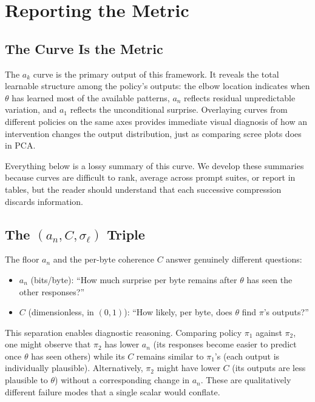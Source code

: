 \section{Reporting the Metric}

\subsection{The Curve Is the Metric}

The $a_k$ curve is the primary output of this framework.
It reveals the total learnable structure among the policy's outputs: the elbow location indicates when $\theta$ has learned most of the available patterns, $a_n$ reflects residual unpredictable variation, and $a_1$ reflects the unconditional surprise.
Overlaying curves from different policies on the same axes provides immediate visual diagnosis of how an intervention changes the output distribution, just as comparing scree plots does in PCA.

Everything below is a lossy summary of this curve.
We develop these summaries because curves are difficult to rank, average across prompt suites, or report in tables, but the reader should understand that each successive compression discards information.

\subsection{The \texorpdfstring{$(a_n, C, \sigma_\ell)$}{(a_n, C, sigma)} Triple}

The floor $a_n$ and the per-byte coherence $C$ answer genuinely different questions:
\begin{itemize}[nosep]
    \item $a_n$ (bits/byte): ``How much surprise per byte remains after $\theta$ has seen the other responses?''
    \item $C$ (dimensionless, in $(0,1)$): ``How likely, per byte, does $\theta$ find $\pi$'s outputs?''
\end{itemize}

This separation enables diagnostic reasoning.
Comparing policy $\pi_1$ against $\pi_2$, one might observe that $\pi_2$ has lower $a_n$ (its responses become easier to predict once $\theta$ has seen others) while its $C$ remains similar to $\pi_1$'s (each output is individually plausible).
Alternatively, $\pi_2$ might have lower $C$ (its outputs are less plausible to $\theta$) without a corresponding change in $a_n$.
These are qualitatively different failure modes that a single scalar would conflate.

